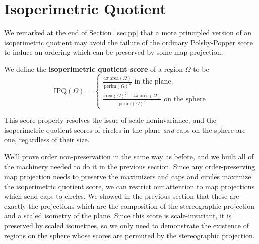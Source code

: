 \section{Isoperimetric Quotient}\label{sec:isoper}


We remarked at the end of Section~\ref{sec:pp} that a more principled version of an isoperimetric quotient may avoid the failure of the ordinary Polsby-Popper score to induce an ordering which can be preserved by some map projection.

\begin{definition}
We define the \textbf{isoperimetric quotient score} of a region $\Omega$ to be$$
\mathrm{IPQ}(\Omega)=
\begin{cases}
\frac{4\pi \ \mathrm{area}(\Omega)}{\mathrm{perim}(\Omega)^2} \text{ in the plane},\\[10pt]
\frac{\mathrm{area}(\Omega)^2 - 4\pi \ \mathrm{area}(\Omega)}{\mathrm{perim}(\Omega)^2}\text{ on the sphere}
\end{cases}
$$
\end{definition}

This score properly resolves the issue of scale-noninvariance, and the isoperimetric quotient scores of circles in the plane \textit{and} caps on the sphere are one, regardless of their size.

We'll prove order non-preservation in the same way as before, and we built all of the machinery needed to do it in the previous section.  Since any order-preserving map projection needs to preserve the maximizers and caps and circles maximize the isoperimetric quotient score, we can restrict our attention to map projections which send caps to circles.  We showed in the previous section that these are exactly the projections which are the composition of the stereographic projection and a scaled isometry of the plane.  Since this score is scale-invariant, it is preserved by scaled isometries, so we only need to demonstrate the existence of regions on the sphere whose scores are permuted by the stereographic projection.


